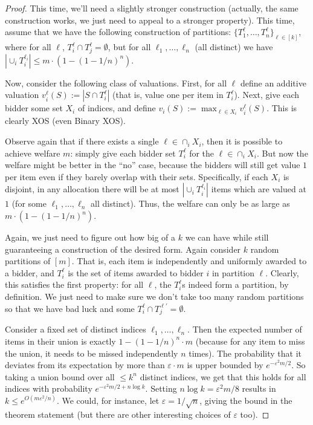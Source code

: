   \begin{proof} This time, we'll need a slightly stronger construction (actually,
    the same construction works, we just need to appeal to a stronger property).
    This time, assume that we have the following construction of partitions:
    $\{T_1^\ell,\ldots, T_n^\ell\}_{\ell \in [k]}$, where for all $\ell$,
    $T_i^\ell \cap T_j^\ell = \emptyset$, but for all $\ell_1,\ldots, \ell_n$ (all
    distinct) we have $|\cup_i T_i^{\ell_i}| \leq m\cdot (1-(1-1/n)^n)$. 

  Now, consider the following class of valuations. First, for all $\ell$ define an
  additive valuation $v_i^\ell(S) := |S \cap T_i^\ell|$ (that is, value one per
  item in $T_i^\ell$). Next, give each bidder some set $X_i$ of indices, and
  define $v_i(S) := \max_{\ell \in X_i} v_i^\ell(S)$. This is clearly XOS (even
  Binary XOS). 

  Observe again that if there exists a single $\ell \in \cap_i X_i$, then it is
  possible to achieve welfare $m$: simply give each bidder set $T_i^\ell$ for the
  $\ell \in \cap_i X_i$. But now the welfare might be better in the ``no'' case,
  because the bidders will still get value $1$ per item even if they barely
  overlap with their sets. Specifically, if each $X_i$ is disjoint,
  in any allocation there will be at most
  $|\cup_i T_i^{\ell_i}|$ items which are valued at $1$
  (for some $\ell_1,\ldots, \ell_n$ all distinct).
  Thus, the welfare can only be as large as 
  $m \cdot (1-(1-1/n)^n)$.

  Again, we just need to figure out how big of a $k$ we can have while still
  guaranteeing a construction of the desired form. Again consider $k$ random
  partitions of $[m]$. That is, each item is independently and uniformly awarded
  to a bidder, and $T_i^\ell$ is the set of items awarded to bidder $i$ in
  partition $\ell$. Clearly, this satisfies the first property: for all $\ell$,
  the $T_i^\ell$s indeed form a partition, by definition. We just need to make
  sure we don't take too many random partitions so that we have bad luck and some
  $T_i^\ell \cap T_j^{\ell'}= \emptyset$. 

  Consider a fixed set of distinct indices $\ell_1,\ldots, \ell_n$. Then the
  expected number of items in their union is exactly $1-(1-1/n)^n \cdot m$
  (because for any item to miss the union, it needs to be missed independently $n$
  times). The probability that it deviates from its expectation by more than
  $\varepsilon \cdot m$ is upper bounded by $e^{-\varepsilon^2 m/2}$. So taking a
  union bound over all $\leq k^n$ distinct indices, we get that this holds for all
  indices with probability $e^{-\varepsilon^2 m/2 + n\log k}$. Setting $n \log k =
  \varepsilon^2 m/8$ results in $k \leq e^{O(m\varepsilon^2/n)}$. We could, for
  instance, let $\varepsilon = 1/\sqrt{n}$, giving the bound in the theorem
  statement (but there are other interesting choices of $\varepsilon$ too).
  \end{proof}

